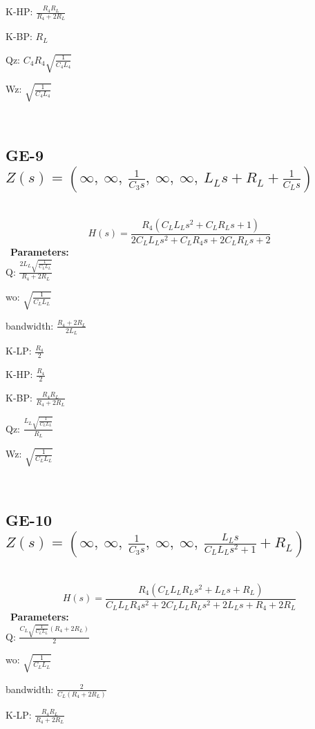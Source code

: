 \documentclass{article}
\begin{document}
K-HP: $\frac{R_{4} R_{L}}{R_{4} + 2 R_{L}}$\ 

K-BP: $R_{L}$\ 

Qz: $C_{4} R_{4} \sqrt{\frac{1}{C_{4} L_{4}}}$\ 

Wz: $\sqrt{\frac{1}{C_{4} L_{4}}}$\ 

\ 

\subsection{GE-9 $Z(s) = \left( \infty, \  \infty, \  \frac{1}{C_{3} s}, \  \infty, \  \infty, \  L_{L} s + R_{L} + \frac{1}{C_{L} s}\right)$ } \ 
\textbf{\[H(s) = \frac{R_{4} \left(C_{L} L_{L} s^{2} + C_{L} R_{L} s + 1\right)}{2 C_{L} L_{L} s^{2} + C_{L} R_{4} s + 2 C_{L} R_{L} s + 2}\] } \ 
\textbf{Parameters:}\\ 

Q: $\frac{2 L_{L} \sqrt{\frac{1}{C_{L} L_{L}}}}{R_{4} + 2 R_{L}}$\ 

wo: $\sqrt{\frac{1}{C_{L} L_{L}}}$\ 

bandwidth: $\frac{R_{4} + 2 R_{L}}{2 L_{L}}$\ 

K-LP: $\frac{R_{4}}{2}$\ 

K-HP: $\frac{R_{4}}{2}$\ 

K-BP: $\frac{R_{4} R_{L}}{R_{4} + 2 R_{L}}$\ 

Qz: $\frac{L_{L} \sqrt{\frac{1}{C_{L} L_{L}}}}{R_{L}}$\ 

Wz: $\sqrt{\frac{1}{C_{L} L_{L}}}$\ 

\ 

\subsection{GE-10 $Z(s) = \left( \infty, \  \infty, \  \frac{1}{C_{3} s}, \  \infty, \  \infty, \  \frac{L_{L} s}{C_{L} L_{L} s^{2} + 1} + R_{L}\right)$ } \ 
\textbf{\[H(s) = \frac{R_{4} \left(C_{L} L_{L} R_{L} s^{2} + L_{L} s + R_{L}\right)}{C_{L} L_{L} R_{4} s^{2} + 2 C_{L} L_{L} R_{L} s^{2} + 2 L_{L} s + R_{4} + 2 R_{L}}\] } \ 
\textbf{Parameters:}\\ 

Q: $\frac{C_{L} \sqrt{\frac{1}{C_{L} L_{L}}} \left(R_{4} + 2 R_{L}\right)}{2}$\ 

wo: $\sqrt{\frac{1}{C_{L} L_{L}}}$\ 

bandwidth: $\frac{2}{C_{L} \left(R_{4} + 2 R_{L}\right)}$\ 

K-LP: $\frac{R_{4} R_{L}}{R_{4} + 2 R_{L}}$\ 
\end{document}

